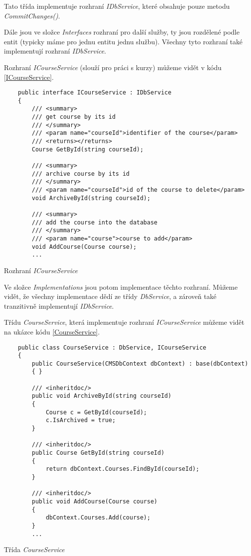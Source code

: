 Tato třída implementuje rozhraní \textit{IDbService}, které obsahuje pouze metodu \textit{CommitChanges()}.

Dále jsou ve složce \textit{Interfaces} rozhraní pro další služby, ty jsou rozdělené podle entit (typicky máme pro jednu entitu jednu službu). Všechny tyto rozhraní také implementují rozhraní \textit{IDbService}. 

Rozhraní \textit{ICourseService} (slouží pro práci s kurzy) můžeme vidět v kódu \ref{ICourseService}.
\begin{program}
	\begin{lstlisting}
	public interface ICourseService : IDbService
	{
		/// <summary>
		/// get course by its id
		/// </summary>
		/// <param name="courseId">identifier of the course</param>
		/// <returns></returns>
		Course GetById(string courseId);
		
		/// <summary>
		/// archive course by its id
		/// </summary>
		/// <param name="courseId">id of the course to delete</param>
		void ArchiveById(string courseId);
		
		/// <summary>
		/// add the course into the database
		/// </summary>
		/// <param name="course">course to add</param>
		void AddCourse(Course course);
		...
	\end{lstlisting}
	\caption{Rozhraní \textit{ICourseService}}
	\label{ICourseService}
\end{program}

Ve složce \textit{Implementations} jsou potom implementace těchto rozhraní. Můžeme vidět, že všechny implementace dědí ze třídy \textit{DbService}, a zároveň také tranzitivně implementují \textit{IDbService}.

Třídu \textit{CourseService}, která implementuje rozhraní \textit{ICourseService} můžeme vidět na ukázce kódu \ref{CourseService}.

\begin{program}
	\begin{lstlisting}
	public class CourseService : DbService, ICourseService
	{
		public CourseService(CMSDbContext dbContext) : base(dbContext)
		{ }
		
		/// <inheritdoc/>
		public void ArchiveById(string courseId)
		{
			Course c = GetById(courseId);
			c.IsArchived = true;
		}
		
		/// <inheritdoc/>
		public Course GetById(string courseId)
		{
			return dbContext.Courses.FindById(courseId);
		}
		
		/// <inheritdoc/>
		public void AddCourse(Course course)
		{
			dbContext.Courses.Add(course);
		}
		...
	\end{lstlisting}
	\caption{Třída \textit{CourseService}}
	\label{CourseService}
\end{program}

